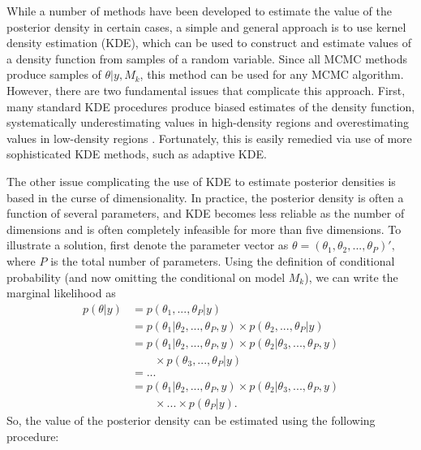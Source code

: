 \documentclass[twocolumn]{article}
\begin{document}
While a number of methods have been developed to estimate the value of the posterior density in certain cases, a simple and general approach is to use kernel density estimation (KDE), which can be used to construct and estimate values of a density function from samples of a random variable. Since all MCMC methods produce samples of $\theta|y, M_k$, this method can be used for any MCMC algorithm. However, there are two fundamental issues that complicate this approach. First, many standard KDE procedures produce biased estimates of the density function, systematically underestimating values in high-density regions and overestimating values in low-density regions \citep{SilvermanDE}. Fortunately, this is easily remedied via use of more sophisticated KDE methods, such as adaptive KDE.

The other issue complicating the use of KDE to estimate posterior densities is based in the curse of dimensionality. In practice, the posterior density is often a function of several parameters, and KDE becomes less reliable as the number of dimensions and is often completely infeasible for more than five dimensions. To illustrate a solution, first denote the parameter vector as $\theta = (\theta_1, \theta_2, ..., \theta_P)',$ where $P$ is the total number of parameters. Using the definition of conditional probability (and now omitting the conditional on model $M_k$), we can write the marginal likelihood as
\begin{subequations}
\begin{align}
	p(\theta|y)
	&= p(\theta_1, ..., \theta_P|y) \\
	&= p(\theta_1|\theta_2, ..., \theta_P, y)\times p(\theta_2, ..., \theta_P|y) \\
	&= p(\theta_1|\theta_2, ..., \theta_P, y)\times p(\theta_2|\theta_3, ..., \theta_P, y) \\ &\qquad\times p(\theta_3, ..., \theta_P|y) \\
	&= ... \\
	&= p(\theta_1|\theta_2, ..., \theta_P, y)\times p(\theta_2|\theta_3, ..., \theta_P, y)\\ &\qquad\times ...\times p(\theta_P|y).
\end{align}
\end{subequations}
So, the value of the posterior density can be estimated using the following procedure:
\end{document}
